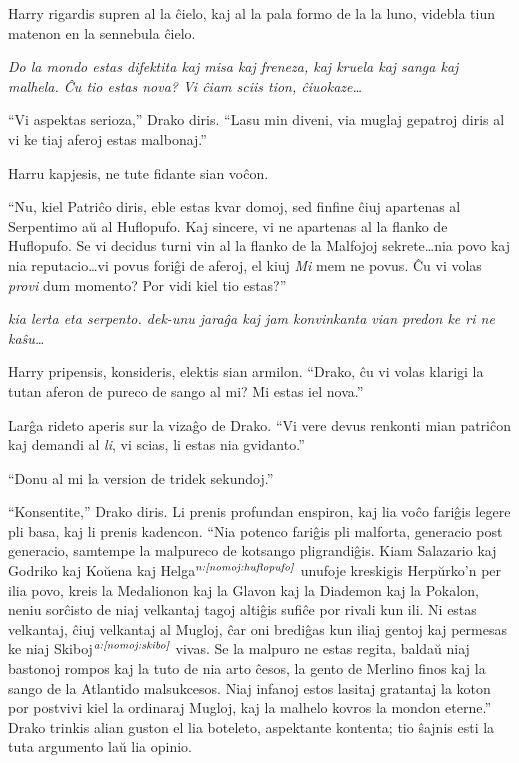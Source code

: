 Harry rigardis supren al la ĉielo, kaj al la pala formo de la la luno,
videbla tiun matenon en la sennebula ĉielo.

\emph{Do la mondo estas difektita kaj misa kaj freneza, kaj kruela kaj
  sanga kaj malhela. Ĉu tio estas nova? Vi ĉiam sciis tion,
  ĉiuokaze\ldots}

``Vi aspektas serioza,'' Drako diris. ``Lasu min diveni, via muglaj
gepatroj diris al vi ke tiaj aferoj estas malbonaj.''

Harru kapjesis, ne tute fidante sian voĉon.

``Nu, kiel Patriĉo diris, eble estas kvar domoj, sed finfine ĉiuj
apartenas al Serpentimo aŭ al Huflopufo. Kaj sincere, vi ne apartenas
al la flanko de Huflopufo. Se vi decidus turni vin al la flanko de la
Malfojoj sekrete\ldots nia povo kaj nia reputacio\ldots vi povus
foriĝi de aferoj, el kiuj \emph{Mi} mem ne povus. Ĉu vi volas
\emph{provi} dum momento? Por vidi kiel tio estas?''

\emph{kia lerta eta serpento. dek-unu jaraĝa kaj jam konvinkanta
  vian predon ke ri ne kaŝu\ldots}

Harry pripensis, konsideris, elektis sian armilon. ``Drako, ĉu vi
volas klarigi la tutan aferon de pureco de sango al mi? Mi estas iel
nova.''

Larĝa rideto aperis sur la vizaĝo de Drako. ``Vi vere devus renkonti
mian patriĉon kaj demandi al \emph{li}, vi scias, li estas nia
gvidanto.''

``Donu al mi la version de tridek sekundoj.''

``Konsentite,'' Drako diris. Li prenis profundan enspiron, kaj lia
voĉo fariĝis legere pli basa, kaj li prenis kadencon. ``Nia potenco
fariĝis pli malforta, generacio post generacio, samtempe la malpureco
de kotsango pligrandiĝis. Kiam Salazario kaj Godriko kaj Koŭena kaj
Helga$^{\textit{n:\ref{nomoj:huflopufo}}}$ unufoje kreskigis Herpŭrko'n per ilia
povo, kreis la Medalionon kaj la Glavon kaj la Diademon kaj la
Pokalon, neniu sorĉisto de niaj velkantaj tagoj altiĝis sufiĉe por
rivali kun ili. Ni estas velkantaj, ĉiuj velkantaj al Mugloj, ĉar oni
brediĝas kun iliaj gentoj kaj permesas ke niaj
Skiboj$^{\textit{a:\ref{nomoj:skibo}}}$ vivas. Se la malpuro ne estas regita,
baldaŭ niaj bastonoj rompos kaj la tuto de nia arto ĉesos, la gento de
Merlino finos kaj la sango de la Atlantido malsukcesos. Niaj infanoj
estos lasitaj gratantaj la koton por postvivi kiel la ordinaraj
Mugloj, kaj la malhelo kovros la mondon eterne.'' Drako trinkis alian
guston el lia boteleto, aspektante kontenta; tio ŝajnis esti la tuta
argumento laŭ lia opinio.


